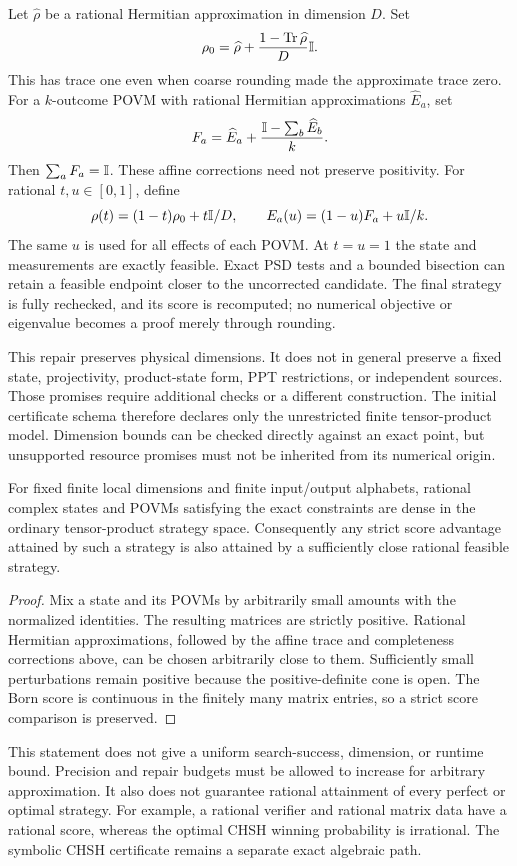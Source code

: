 Let $\widehat\rho$ be a rational Hermitian approximation in dimension $D$.
Set
\[
 \rho_0=\widehat\rho+\frac{1-\operatorname{Tr}\widehat\rho}{D}\mathbb I.
\]
This has trace one even when coarse rounding made the approximate trace zero.
For a $k$-outcome POVM with rational Hermitian approximations $\widehat E_a$, set
\[
 F_a=\widehat E_a+\frac{\mathbb I-\sum_b\widehat E_b}{k}.
\]
Then $\sum_aF_a=\mathbb I$. These affine corrections need not preserve positivity.
For rational $t,u\in[0,1]$, define
\[
 \rho(t)=(1-t)\rho_0+t\mathbb I/D,\qquad
 E_a(u)=(1-u)F_a+u\mathbb I/k.
\]
The same $u$ is used for all effects of each POVM. At $t=u=1$ the state and
measurements are exactly feasible. Exact PSD tests and a bounded bisection can
retain a feasible endpoint closer to the uncorrected candidate. The final
strategy is fully rechecked, and its score is recomputed; no numerical objective
or eigenvalue becomes a proof merely through rounding.

This repair preserves physical dimensions. It does not in general preserve a
fixed state, projectivity, product-state form, PPT restrictions, or independent
sources. Those promises require additional checks or a different construction.
The initial certificate schema therefore declares only the unrestricted finite
tensor-product model. Dimension bounds can be checked directly against an exact
point, but unsupported resource promises must not be inherited from its numerical
origin.

\begin{proposition}
For fixed finite local dimensions and finite input/output alphabets, rational
complex states and POVMs satisfying the exact constraints are dense in the
ordinary tensor-product strategy space. Consequently any strict score advantage
attained by such a strategy is also attained by a sufficiently close rational
feasible strategy.
\end{proposition}
\begin{proof}
Mix a state and its POVMs by arbitrarily small amounts with the normalized
identities. The resulting matrices are strictly positive. Rational Hermitian
approximations, followed by the affine trace and completeness corrections above,
can be chosen arbitrarily close to them. Sufficiently small perturbations remain
positive because the positive-definite cone is open. The Born score is continuous
in the finitely many matrix entries, so a strict score comparison is preserved.
\end{proof}
This statement does not give a uniform search-success, dimension, or runtime
bound. Precision and repair budgets must be allowed to increase for arbitrary
approximation. It also does not guarantee rational attainment of every perfect
or optimal strategy. For example, a rational verifier and rational matrix data
have a rational score, whereas the optimal CHSH winning probability is irrational.
The symbolic CHSH certificate remains a separate exact algebraic path.

